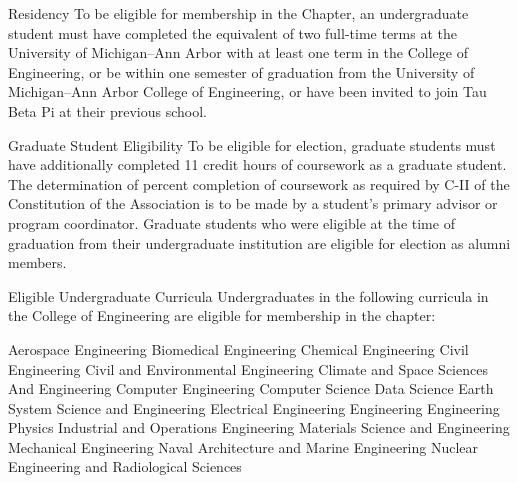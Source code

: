 \begin{enumsubsection}
\item{Residency} To be eligible for membership in the Chapter, an undergraduate student must have completed the equivalent of two full-time terms at the University of Michigan--Ann Arbor with at least one term in the College of Engineering, or be within one semester of graduation from the University of Michigan--Ann Arbor College of Engineering, or have been invited to join Tau Beta Pi at their previous school.
\item{Graduate Student Eligibility}\label{sec:grad_elig} To be eligible for election, graduate students must have additionally completed 11 credit hours of coursework as a graduate student. The determination of percent completion of coursework as required by C-II of the Constitution of the Association is to be made by a student's primary advisor or program coordinator. Graduate students who were eligible at the time of graduation from their undergraduate institution are eligible for election as alumni members.
\item{Eligible Undergraduate Curricula}\label{sec:ugrad_cur}  Undergraduates in the following curricula in the College of Engineering are eligible for membership in the chapter:

\let\oldenumi\labelenumii
\renewcommand{\labelenumii}{\arabic{enumii}.}
\begin{enumsubsubsection}

\itemnotoc Aerospace Engineering
\itemnotoc Biomedical Engineering
\itemnotoc Chemical Engineering
\itemnotoc Civil Engineering
\itemnotoc Civil and Environmental Engineering
\itemnotoc Climate and Space Sciences And Engineering
\itemnotoc Computer Engineering
\itemnotoc Computer Science
\itemnotoc Data Science
\itemnotoc Earth System Science and Engineering
\itemnotoc Electrical Engineering
\itemnotoc Engineering
\itemnotoc Engineering Physics
\itemnotoc Industrial and Operations Engineering
\itemnotoc Materials Science and Engineering
\itemnotoc Mechanical Engineering
\itemnotoc Naval Architecture and Marine Engineering
\itemnotoc Nuclear Engineering and Radiological Sciences


\end{enumsubsubsection}
\end{enumsubsection}
